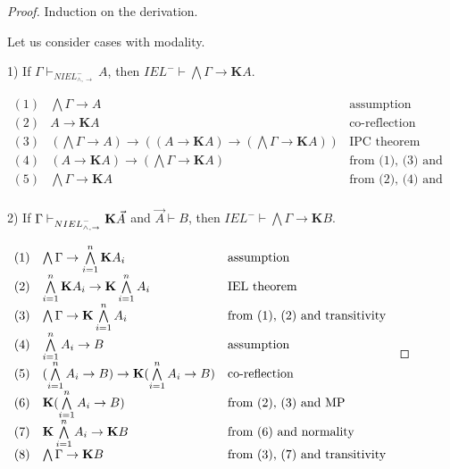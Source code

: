 \documentclass[a4paper]{article}
\begin{document}
  \begin{proof}
Induction on the derivation.

  \vspace{\baselineskip}

Let us consider cases with modality.

\vspace{\baselineskip}

1) If $\Gamma \vdash_{NIEL^{-}_{\land, \to}} A$, then $IEL^{-} \vdash \bigwedge \Gamma \rightarrow \textbf{K}A$.

$\begin{array}{lll}
(1) & \bigwedge \Gamma \rightarrow A & \text{assumption}\\
(2) & A \rightarrow \textbf{K}A &\text{co-reflection}\\
(3) & (\bigwedge \Gamma \rightarrow A) \rightarrow ((A \rightarrow \textbf{K}A) \rightarrow (\bigwedge \Gamma \rightarrow \textbf{K}A))&\text{IPC theorem}\\
(4) & (A \rightarrow \textbf{K}A) \rightarrow (\bigwedge \Gamma \rightarrow \textbf{K}A) &\text{from (1), (3) and MP}\\
(5) & \bigwedge \Gamma \rightarrow \textbf{K}A &\text{from (2), (4) and MP}\\
\end{array}$

\vspace{\baselineskip}

2) If $\Gamma \vdash_{NIEL^{-}_{\land, \to}} {\bf K} \vec{A}$ and $\vec{A} \vdash B$, then $IEL^{-} \vdash \bigwedge \Gamma \rightarrow \textbf{K}B$.

$\begin{array}{lll}
(1) &\bigwedge \Gamma \rightarrow \bigwedge \limits_{i = 1}^{n} {\bf K} A_i & \text{assumption} \\
(2) &\bigwedge \limits_{i = 1}^{n} {\bf K} A_i \rightarrow {\bf K} \bigwedge \limits_{i = 1}^{n} A_i& \text{IEL theorem} \\
(3) &\bigwedge \Gamma \rightarrow {\bf K} \bigwedge \limits_{i = 1}^{n} A_i & \text{from (1), (2) and transitivity} \\
(4) &\bigwedge \limits_{i = 1}^{n} A_i \rightarrow B& \text{assumption} \\
(5) &(\bigwedge \limits_{i = 1}^{n} A_i \rightarrow B) \rightarrow {\bf K} (\bigwedge \limits_{i = 1}^{n} A_i \rightarrow B)& \text{co-reflection}\\
(6) &{\bf K} (\bigwedge \limits_{i = 1}^{n} A_i \rightarrow B)& \text{from (2), (3) and MP} \\
(7) &{\bf K} \bigwedge \limits_{i = 1}^{n} A_i \rightarrow {\bf K} B & \text{from (6) and normality} \\
(8) &\bigwedge \Gamma \rightarrow {\bf K} B & \text{from (3), (7) and transitivity}
\end{array}$

  \end{proof}
\end{document}
